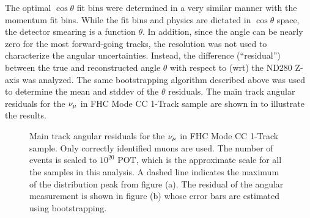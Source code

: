 The optimal $\cos\theta$ fit bins were determined in a very similar
manner with the momentum fit bins. While the fit bins and physics
are dictated in $\cos\theta$ space, the detector smearing is a function
$\theta$. In addition, since the angle can be nearly zero for the
most forward-going tracks, the resolution was not used to characterize
the angular uncertainties. Instead, the difference (``residual'')
between the true and reconstructed angle $\theta$ with respect to
(wrt) the ND280 Z-axis was analyzed. The same bootstrapping algorithm
described above was used to determine the mean and stddev of the $\theta$
residuals. The main track angular residuals for the $\numu$ in FHC
Mode CC 1-Track sample are shown in 
to illustrate the results.

\begin{figure}
\begin{centering}
\par\end{centering}
\caption[Main Track Angular Residuals for the $\numu$ in FHC Mode CC 1-Track
Sample]{Main track angular residuals for the $\protect\nu_{\mu}$ in FHC Mode
CC 1-Track sample. Only correctly identified muons are used. The number
of events is scaled to $10^{20}$ POT, which is the approximate scale
for all the samples in this analysis. A dashed line indicates the
maximum of the distribution peak from figure (a). The residual of
the angular measurement is shown in figure (b) whose error bars are
estimated using bootstrapping. \label{fig:AngularKinematicsBootstrappingNumuCC1Track}}
\end{figure}

